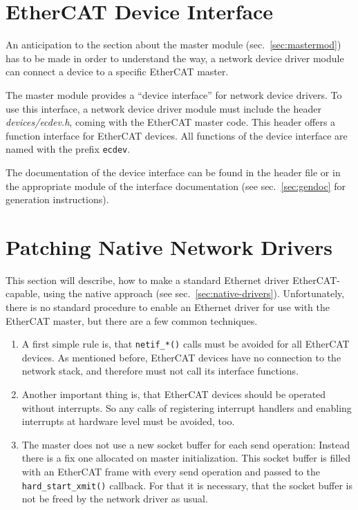 \documentclass[a4paper,12pt,BCOR6mm,bibtotoc,idxtotoc]{scrbook}
\begin{document}
\section{EtherCAT Device Interface}
\label{sec:ecdev}

An anticipation to the section about the master module
(sec.~\ref{sec:mastermod}) has to be made in order to understand the way, a
network device driver module can connect a device to a specific EtherCAT
master.

The master module provides a ``device interface'' for network device drivers.
To use this interface, a network device driver module must include the header
\textit{devices/ecdev.h}, coming with the
EtherCAT master code. This header offers a function interface for EtherCAT
devices. All functions of the device interface are named with the prefix
\lstinline+ecdev+.

The documentation of the device interface can be found in the header file or
in the appropriate module of the interface documentation (see
sec.~\ref{sec:gendoc} for generation instructions).



\section{Patching Native Network Drivers}
\label{sec:patching}

This section will describe, how to make a standard Ethernet driver
EtherCAT-capable, using the native approach (see
sec.~\ref{sec:native-drivers}). Unfortunately, there is no standard procedure
to enable an Ethernet driver for use with the EtherCAT master, but there are a
few common techniques.

\begin{enumerate}

\item A first simple rule is, that \lstinline+netif_*()+ calls must be avoided
for all EtherCAT devices. As mentioned before, EtherCAT devices have no
connection to the network stack, and therefore must not call its interface
functions.

\item Another important thing is, that EtherCAT devices should be operated
without interrupts. So any calls of registering interrupt handlers and enabling
interrupts at hardware level must be avoided, too.

\item The master does not use a new socket buffer for each send operation:
Instead there is a fix one allocated on master initialization. This socket
buffer is filled with an EtherCAT frame with every send operation and passed to
the \lstinline+hard_start_xmit()+ callback. For that it is necessary, that the
socket buffer is not be freed by the network driver as usual.

\end{enumerate}
\end{document}
